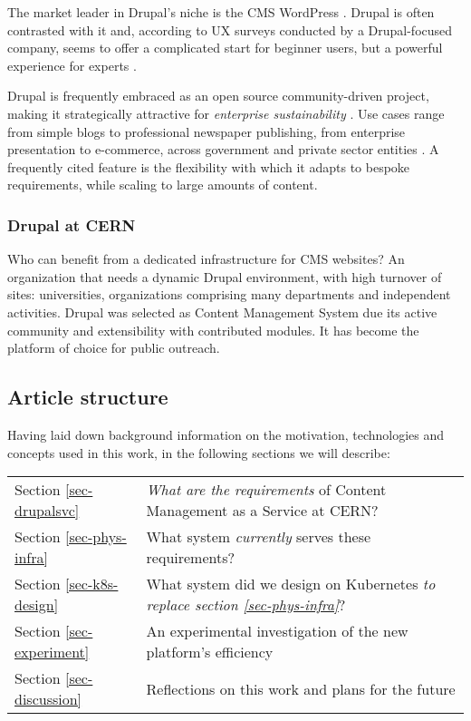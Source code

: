 The market leader in Drupal's niche is the CMS WordPress \cite{builtwith_pty_ltd_open_nodate}.
Drupal is often contrasted with it and, according to UX surveys conducted by a Drupal-focused company, seems to offer a complicated start for beginner users,
but a powerful experience for experts \cite{buytaert_state_nodate}.

Drupal is frequently embraced as an open source community-driven project, making it strategically attractive for \emph{enterprise sustainability} \cite{cern_geneva_real_2019}.
Use cases range from simple blogs to professional newspaper publishing, from enterprise presentation to e-commerce, across government and private sector entities \cite{drupal_community_explore_nodate}.
A frequently cited feature is the flexibility with which it adapts to bespoke requirements, while scaling to large amounts of content.

\subsubsection*{Drupal at CERN}
\label{drupal-at-cern}

Who can benefit from a dedicated infrastructure for CMS websites?
An organization that needs a dynamic Drupal environment, with high turnover of sites: universities, organizations comprising many departments and independent activities.
Drupal was selected as Content Management System due its active community and extensibility with contributed modules.
It has become the platform of choice for public outreach.

\subsection{Article structure}

Having laid down background information on the motivation, technologies and concepts used in this work, in the following sections we will describe:

\begin{tabular}{l|l}
    Section \ref{sec-drupalsvc} & \emph{What are the requirements} of Content Management as a Service at CERN?  \\
    Section \ref{sec-phys-infra} & What system \emph{currently} serves these requirements? \\
    Section \ref{sec-k8s-design} & What system did we design on Kubernetes \emph{to replace section \ref{sec-phys-infra}}? \\
    Section \ref{sec-experiment} & An experimental investigation of the new platform's efficiency \\
    Section \ref{sec-discussion} & Reflections on this work and plans for the future \\
\end{tabular}